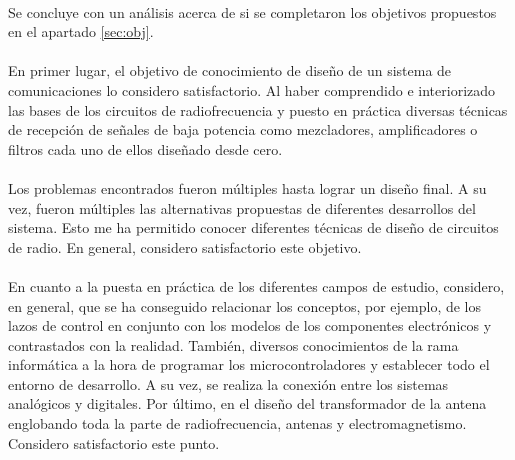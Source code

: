 \paragraph{}
Se concluye con un análisis acerca de si se completaron los objetivos propuestos en el apartado \ref{sec:obj}.
\paragraph{}
En primer lugar, el objetivo de conocimiento de diseño de un sistema de comunicaciones lo considero satisfactorio. Al haber comprendido e interiorizado las bases de los circuitos de radiofrecuencia y puesto en práctica diversas técnicas de recepción de señales de baja potencia como mezcladores, amplificadores o filtros cada uno de ellos diseñado desde cero.
\paragraph{}
Los problemas encontrados fueron múltiples hasta lograr un diseño final. A su vez, fueron múltiples las alternativas propuestas de diferentes desarrollos del sistema. Esto me ha permitido conocer diferentes técnicas de diseño de circuitos de radio. En general, considero satisfactorio este objetivo.
\paragraph{}
En cuanto a la puesta en práctica de los diferentes campos de estudio, considero, en general, que se ha conseguido relacionar los conceptos, por ejemplo, de los lazos de control en conjunto con los modelos de los componentes electrónicos y contrastados con la realidad. 
También, diversos conocimientos de la rama informática a la hora de programar los microcontroladores y establecer todo el entorno de desarrollo. A su vez, se realiza la conexión entre los sistemas analógicos y digitales.
Por último, en el diseño del transformador de la antena englobando toda la parte de radiofrecuencia, antenas y electromagnetismo. Considero satisfactorio este punto.
